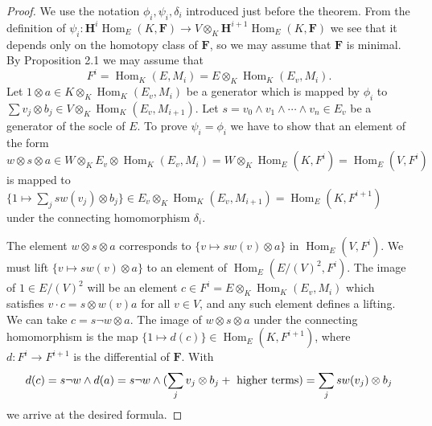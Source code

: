 \documentclass{tran-l}
\newcommand{\tensor}{\otimes}
\newcommand{\myHom}{\operatorname{Hom}}
\newcommand{\FF}{\mathbf{F}}
\newcommand{\myH}{\mathbf{H}}
\theoremstyle{plain}
\theoremstyle{remark}
\theoremstyle{definition}
\begin{document}
\begin{proof}  We use the notation $\phi _{i},\psi _{i},\delta _{i}$ introduced just before the theorem. 
From the definition of
$\psi _{i}:  \myH ^{i}\myHom _{E}(K,\FF ) \to V \otimes _{K}\myH ^{i+1} \myHom _{E}(K, \FF ) $
 we see that it depends only on the homotopy class of $\FF $,
 so we may
assume that $\FF $ is minimal.
By Proposition 2.1 we may assume that
\begin{equation*}F^{i}=\myHom _{K}(E,M_{i})=E \otimes _{K} \myHom
_{K}(E_{v},M_{i}).
\end{equation*}
Let $1 \tensor a \in K \otimes _{K} \myHom _{K}(E_{v},M_{i})$ be a generator which is 
mapped by $\phi _{i}$ to $\sum v_{j} \otimes b_{j} \in V \otimes _{K} \myHom _{K}(E_{v},M_{i+1})$.
Let $s=v_{0} \wedge v_{1} \wedge \cdots \wedge v_{n} \in E_{v}$ be a generator
of the socle of $E$. To prove $\psi _{i}=\phi _{i}$ we have to
show that an element of the form
$w \tensor s \tensor a \in W\otimes _{K} E_{v} \tensor \myHom _{K}(E_{v},M_{i})=W \tensor _{K} \myHom _{E}(K,F^{i})=\myHom _{E}(V,F^{i})$
is mapped to 
$\{1 \mapsto \sum _{j} sw(v_{j})\tensor b_{j}\} \in E_{v} \tensor _{K} \myHom _{K}(E_{v},M_{i+1})=\myHom _{E}(K,F^{i+1})$
under the connecting homomorphism $\delta _{i}$.
   
The element $w\tensor s \tensor a$ corresponds to $\{ v \mapsto sw(v) \tensor a\}$ in $\myHom _{E}(V,F^{i})$.
We must lift $\{v\mapsto sw(v)\tensor a \}$ to an element
of $\myHom _{E}(E/(V)^{2},F^{i})$. The image of $1 \in E/(V)^{2}$ will be an element $c \in F^{i}=E\tensor _{K} \myHom _{K}(E_{v},M_{i})$
which satisfies $v\cdot c = s\tensor w(v) a$ for all $v \in V$,
and any such element defines a lifting.
We can take $c= s \lnot w \tensor a$.
The image of $w\otimes s\tensor a$ under the connecting homomorphism is the
map  $\{1 \mapsto d(c)\} \in \myHom _{E}(K,F^{i+1})$, where $d: F^{i} \to F^{i+1}$ is the 
differential of $\FF $. With
\begin{equation*}d(c)=s\lnot w \wedge d(a)= s\lnot w \wedge (\sum _{j}  v_{j} \tensor b_{j} + \hbox { higher terms}) = \sum _{j} s w(v_{j}) \tensor b_{j} 
\end{equation*}
we arrive at the desired formula.
\end{proof}
\end{document}
